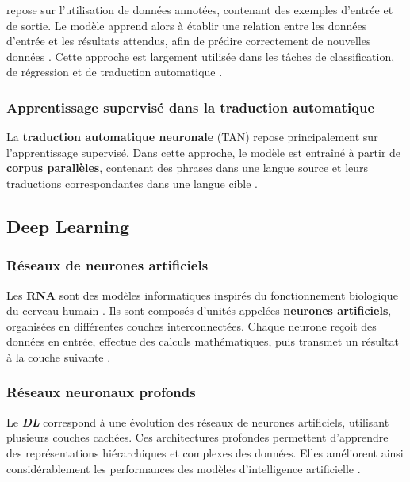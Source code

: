 repose sur l'utilisation de données annotées, contenant des exemples d'entrée et de sortie. Le modèle apprend alors à établir une relation entre les données d'entrée et les résultats attendus, afin de prédire correctement de nouvelles données \cite{Goodfellow-et-al-2016}. Cette approche est largement utilisée dans les tâches de classification, de régression et de traduction automatique \cite{ranathunga2023neural}.

\subsubsection{Apprentissage supervisé dans la traduction automatique}

La \textbf{traduction automatique neuronale} (\ac{TAN}) repose principalement sur l'apprentissage supervisé. Dans cette approche, le modèle est entraîné à partir de \textbf{corpus parallèles}, contenant des phrases dans une langue source et leurs traductions correspondantes dans une langue cible \cite{ranathunga2023neural, haulai2023construction, jindal2017building}.

\subsection{Deep Learning}

\subsubsection{Réseaux de neurones artificiels}

Les \textbf{\ac{RNA}} sont des modèles informatiques inspirés du fonctionnement biologique du cerveau humain \cite{Goodfellow-et-al-2016}. Ils sont composés d'unités appelées \textbf{neurones artificiels}, organisées en différentes couches interconnectées. Chaque neurone reçoit des données en entrée, effectue des calculs mathématiques, puis transmet un résultat à la couche suivante \cite{Goodfellow-et-al-2016}.

\subsubsection{Réseaux neuronaux profonds}

Le \textbf{\textit{\ac{DL}}} correspond à une évolution des réseaux de neurones artificiels, utilisant plusieurs couches cachées. Ces architectures profondes permettent d'apprendre des représentations hiérarchiques et complexes des données. Elles améliorent ainsi considérablement les performances des modèles d'intelligence artificielle \cite{Goodfellow-et-al-2016}.

